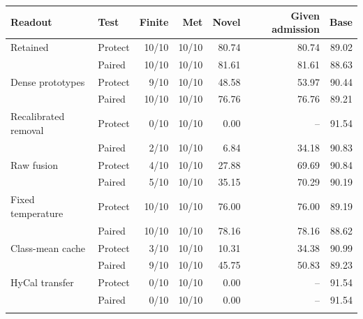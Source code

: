 \begin{tabular}{@{}llrrrrr@{}}
\toprule
Readout & Test & Finite & Met & Novel & Given admission & Base \\
\midrule
Retained & Protect & 10/10 & 10/10 & 80.74 & 80.74 & 89.02 \\
 & Paired & 10/10 & 10/10 & 81.61 & 81.61 & 88.63 \\
\addlinespace[2pt]
Dense prototypes & Protect & 9/10 & 10/10 & 48.58 & 53.97 & 90.44 \\
 & Paired & 10/10 & 10/10 & 76.76 & 76.76 & 89.21 \\
\addlinespace[2pt]
Recalibrated removal & Protect & 0/10 & 10/10 & 0.00 & -- & 91.54 \\
 & Paired & 2/10 & 10/10 & 6.84 & 34.18 & 90.83 \\
\addlinespace[2pt]
Raw fusion & Protect & 4/10 & 10/10 & 27.88 & 69.69 & 90.84 \\
 & Paired & 5/10 & 10/10 & 35.15 & 70.29 & 90.19 \\
\addlinespace[2pt]
Fixed temperature & Protect & 10/10 & 10/10 & 76.00 & 76.00 & 89.19 \\
 & Paired & 10/10 & 10/10 & 78.16 & 78.16 & 88.62 \\
\addlinespace[2pt]
Class-mean cache & Protect & 3/10 & 10/10 & 10.31 & 34.38 & 90.99 \\
 & Paired & 9/10 & 10/10 & 45.75 & 50.83 & 89.23 \\
\addlinespace[2pt]
HyCal transfer & Protect & 0/10 & 10/10 & 0.00 & -- & 91.54 \\
 & Paired & 0/10 & 10/10 & 0.00 & -- & 91.54 \\
\addlinespace[2pt]
\bottomrule
\end{tabular}
